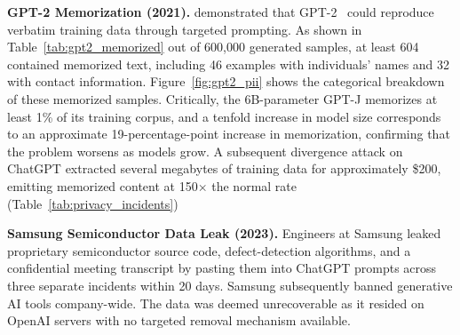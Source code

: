 \begin{table}[htbp]
\centering
\caption{Privacy incidents in machine learning models, showing failure mode and risk scale.}
\label{tab:privacy_incidents}
\end{table}

\textbf{GPT-2 Memorization (2021).} \citeauthor{carlini2021extracting} demonstrated that GPT-2~\citeauthor{Radford2019LanguageMA} could reproduce verbatim training data through targeted prompting. As shown in Table~\ref{tab:gpt2_memorized} out of 600,000 generated samples, at least 604 contained memorized text, including 46 examples with individuals' names and 32 with contact information. Figure~\ref{fig:gpt2_pii} shows the categorical breakdown of these memorized samples. Critically, the 6B-parameter GPT-J memorizes at least 1\% of its training corpus, and a tenfold increase in model size corresponds to an approximate 19-percentage-point increase in memorization, confirming that the problem worsens as models grow. A subsequent divergence attack on ChatGPT extracted several megabytes of training data for approximately \$200, emitting memorized content at 150$\times$ the normal rate (Table~\ref{tab:privacy_incidents})~\citeauthor{nasr2023scalable}


\textbf{Samsung Semiconductor Data Leak (2023).} Engineers at Samsung leaked proprietary semiconductor source code, defect-detection algorithms, and a confidential meeting transcript by pasting them into ChatGPT prompts across three separate incidents within 20 days. Samsung subsequently banned generative AI tools company-wide. The data was deemed unrecoverable as it resided on OpenAI servers with no targeted removal mechanism available.

